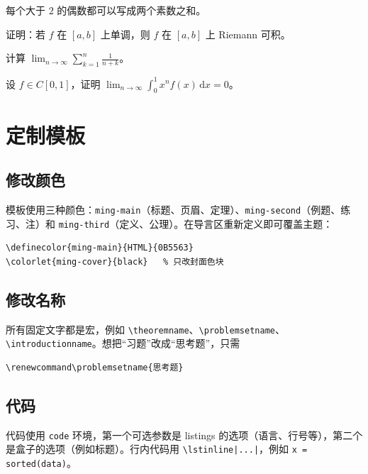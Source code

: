 \documentclass[lang=cn, theme=blue, thmstyle=fancy, twoside]{mingbook}
\begin{document}
\begin{conjecture}[Goldbach]
每个大于 $2$ 的偶数都可以写成两个素数之和。
\end{conjecture}

\begin{problemset}
  \item 证明：若 $f$ 在 $[a,b]$ 上单调，则 $f$ 在 $[a,b]$ 上 Riemann 可积。
  \item 计算 $\displaystyle\lim_{n\to\infty}\sum_{k=1}^{n}\frac{1}{n+k}$。
  \item 设 $f\in C[0,1]$，证明 $\displaystyle\lim_{n\to\infty}\int_0^1 x^n f(x)\,\mathrm{d}x=0$。
\end{problemset}

\chapter{定制模板}

\section{修改颜色}

模板使用三种颜色：\texttt{ming-main}（标题、页眉、定理）、\texttt{ming-second}（例题、练习、注）和 \texttt{ming-third}（定义、公理）。在导言区重新定义即可覆盖主题：
\begin{verbatim}
\definecolor{ming-main}{HTML}{0B5563}
\colorlet{ming-cover}{black}   % 只改封面色块
\end{verbatim}

\section{修改名称}

所有固定文字都是宏，例如 \verb|\theoremname|、\verb|\problemsetname|、\verb|\introductionname|。想把“习题”改成“思考题”，只需
\begin{verbatim}
\renewcommand\problemsetname{思考题}
\end{verbatim}

\section{代码}

代码使用 \texttt{code} 环境，第一个可选参数是 listings 的选项（语言、行号等），第二个是盒子的选项（例如标题）。行内代码用 \verb+\lstinline|...|+，例如 \lstinline|x = sorted(data)|。
\end{document}

